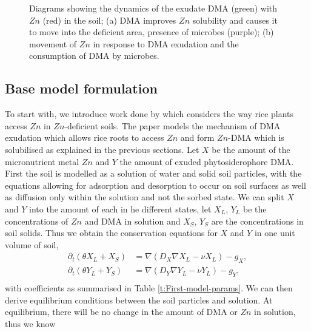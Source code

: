 \documentclass[11pt]{article}
\begin{document}
\begin{figure}[h]
\begin{subfigure}[t]{0.4\textwidth}
    \caption{
    }
    \label{fig:my_label}
\end{subfigure}
\caption{Diagrams showing the dynamics of the exudate DMA (green) with $Zn$ (red) in the soil; (a) DMA improves $Zn$ solubility and causes it to move into the deficient area, presence of microbes (purple); (b) movement of $Zn$ in response to DMA exudation and the consumption of DMA by microbes.}
\end{figure}


\subsection{Base model formulation}
To start with, we introduce work done by \cite{Ptashnyk-2011} which considers the way rice plants access $Zn$ in $Zn$-deficient soils. The paper models the mechanism of DMA exudation which allows rice roots to access $Zn$ and form $Zn$-DMA which is solubilised as explained in the previous sections. Let $X$ be the amount of the micronutrient metal $Zn$ and $Y$ the amount of exuded phytosiderophore DMA. First the soil is modelled as a solution of water and solid soil particles, with the equations allowing for adsorption and desorption to occur on soil surfaces as well as diffusion only within the solution and not the sorbed state. We can split $X$ and $Y$ into the amount of each in he different states, let $X_L$, $Y_L$ be the concentrations of $Zn$ and DMA in solution and $X_S$, $Y_S$ are the concentrations in soil solids. Thus we obtain the conservation equations for $X$ and $Y$ in one unit volume of soil,
\begin{equation}
    \begin{aligned}
        \partial_t(\theta X_L+X_S)&=\nabla (D_X\nabla X_L-\nu X_L)-g_X,\\
        \partial_t(\theta Y_L+Y_S)&=\nabla (D_Y\nabla Y_L-\nu Y_L)-g_Y,\\
    \end{aligned}
    \label{eq:1}
\end{equation}
with coefficients as summarised in Table \ref{t:First-model-params}. We can then derive equilibrium conditions between the soil particles and solution. At equilibrium, there will be no change in the amount of DMA or $Zn$ in solution, thus we know
\end{document}
